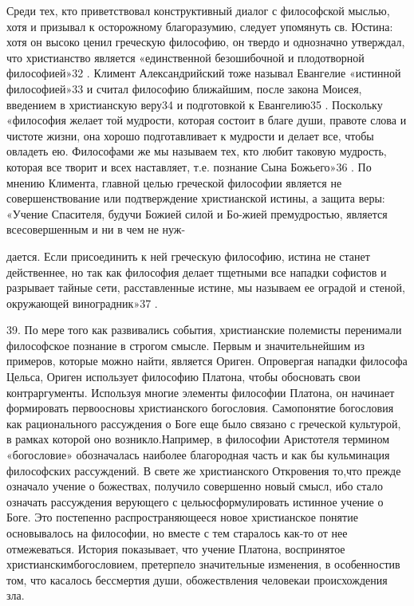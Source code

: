 \documentclass[a5paper,10pt]{article}
\begin{document}
Среди тех, кто приветствовал конструктивный диалог с философской мыслью, хотя и
призывал к осторожному благоразумию, следует упомянуть св. Юстина: хотя он
высоко ценил греческую философию, он твердо и однозначно утверждал, что
христианство является «единственной безошибочной и плодотворной философией»32 .
Климент Александрийский тоже называл Евангелие «истинной философией»33 и считал
философию ближайшим, после закона Моисея, введением в христианскую веру34 и
подготовкой к Евангелию35 . Поскольку «философия желает той мудрости, которая
состоит в благе души, правоте слова и чистоте жизни, она хорошо подготавливает
к мудрости и делает все, чтобы овладеть ею. Философами же мы называем тех, кто
любит таковую мудрость, которая все творит и всех наставляет, т.е. познание
Сына Божьего»36 . По мнению Климента, главной целью греческой философии
является не совершенствование или подтверждение христианской истины, а защита
веры: «Учение Спасителя, будучи Божией силой и Бо-жией премудростью, является
всесовершенным и ни в чем не нуж-

дается. Если присоединить к ней греческую философию, истина не станет
действеннее, но так как философия делает тщетными все нападки софистов и
разрывает тайные сети, расставленные истине, мы называем ее оградой и стеной,
окружающей виноградник»37 .

39. По мере того как развивались события, христианские полемисты перенимали
философское познание в строгом смысле. Первым и значительнейшим из примеров,
которые можно найти, является Ориген. Опровергая нападки философа Цельса,
Ориген использует философию Платона, чтобы обосновать свои контраргументы.
Используя многие элементы философии Платона, он начинает формировать
первоосновы христианского богословия. Самопонятие богословия как рационального
рассуждения о Боге еще было связано с греческой культурой, в рамках которой оно
возникло.Например, в философии Аристотеля термином «богословие» обозначалась
наиболее благородная часть и как бы кульминация философских рассуждений. В
свете же христианского Откровения то,что прежде означало учение о божествах,
получило совершенно новый смысл, ибо стало означать рассуждения верующего с
цельюсформулировать истинное учение о Боге. Это постепенно распространяющееся
новое христианское понятие основывалось на философии, но вместе с тем старалось
как-то от нее отмежеваться. История показывает, что учение Платона, воспринятое
христианскимбогословием, претерпело значительные изменения, в особенностив том,
что касалось бессмертия души, обожествления человекаи происхождения зла.
\end{document}
